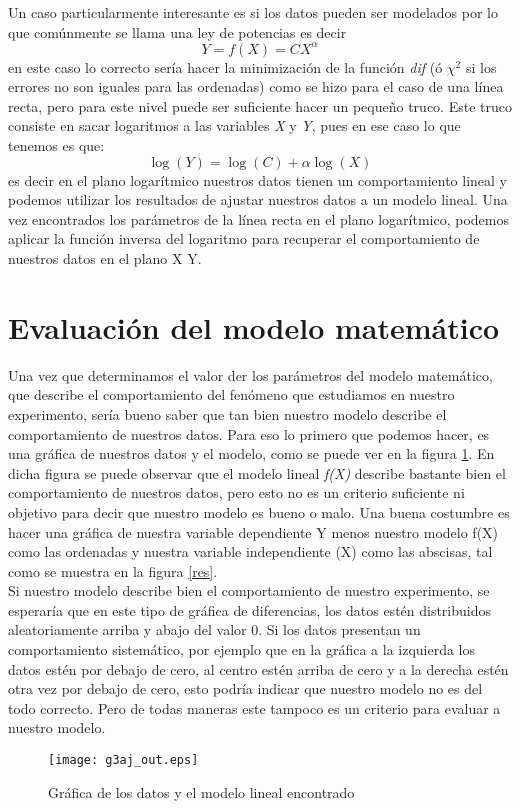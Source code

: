 \documentclass[12pt,letterpaper]{report}
\begin{document}
Un caso particularmente interesante es si los datos pueden ser modelados por lo que comúnmente se llama una ley de potencias es decir 
\begin{equation}
Y=f(X)=CX^{\alpha}
\end{equation}
en este caso lo correcto sería hacer la minimización de la función \textit{dif} (ó $ \chi^{2} $ si los errores no son iguales para las ordenadas) como se hizo para el caso de una línea recta, pero para este nivel puede ser suficiente hacer un pequeño truco. Este truco consiste en  sacar logaritmos a las variables  \textit{X} y \textit{Y}, pues en ese caso lo que tenemos es que:
\begin{equation}
\log (Y)= \log (C) + \alpha \log (X)
\end{equation}
 es decir en el plano logarítmico nuestros datos tienen un comportamiento lineal y podemos utilizar  los resultados de ajustar nuestros datos a un modelo lineal. Una vez  encontrados los parámetros de la línea recta en el plano logarítmico, podemos aplicar la función inversa del logaritmo para recuperar el comportamiento de nuestros datos en el plano X Y.

\section{Evaluación del modelo matemático}
  
Una vez que determinamos el valor der los parámetros del modelo matemático, que describe el comportamiento del fenómeno que estudiamos en nuestro experimento, sería bueno saber que tan bien nuestro modelo describe el comportamiento de nuestros datos. Para eso lo primero que podemos hacer, es una gráfica de nuestros datos y el modelo, como se puede ver en la figura \ref{gaj}. En dicha figura se puede observar que el modelo lineal \textit{f(X)} describe bastante bien el comportamiento de nuestros datos, pero esto no es un criterio suficiente ni objetivo para decir que nuestro modelo es bueno o malo. Una buena costumbre es hacer una gráfica de nuestra variable dependiente Y menos nuestro modelo f(X) como las ordenadas y nuestra variable independiente  (X) como las abscisas, tal como se muestra en la figura \ref{res}. \\

Si nuestro modelo describe bien el comportamiento de nuestro experimento, se esperaría que en este tipo de gráfica de diferencias, los datos estén distribuidos aleatoriamente arriba y abajo del valor 0. Si los datos presentan un comportamiento sistemático, por  ejemplo que en la gráfica a la izquierda los datos estén por debajo de cero, al centro estén arriba de cero y a la derecha estén otra vez por debajo de cero, esto podría indicar que nuestro modelo no es del todo correcto. Pero de todas maneras este  tampoco es un  criterio para evaluar a nuestro modelo.  \\
\begin{figure}
\begin{center}
\texttt{[image: g3aj\_out.eps]}
\caption{Gráfica de los datos y el modelo lineal encontrado}\label{gaj}
\end{center}
\end{figure}
\end{document}
